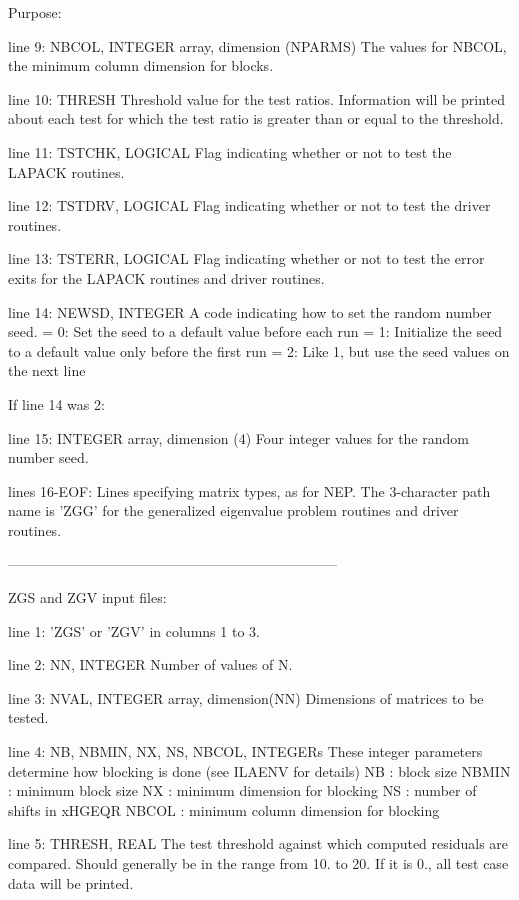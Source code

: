 \begin{DoxyParagraph}{Purpose\+: }
\begin{DoxyVerb}
 line 9:  NBCOL, INTEGER array, dimension (NPARMS)
          The values for NBCOL, the minimum column dimension for
          blocks.

 line 10: THRESH
          Threshold value for the test ratios.  Information will be
          printed about each test for which the test ratio is greater
          than or equal to the threshold.

 line 11: TSTCHK, LOGICAL
          Flag indicating whether or not to test the LAPACK routines.

 line 12: TSTDRV, LOGICAL
          Flag indicating whether or not to test the driver routines.

 line 13: TSTERR, LOGICAL
          Flag indicating whether or not to test the error exits for
          the LAPACK routines and driver routines.

 line 14: NEWSD, INTEGER
          A code indicating how to set the random number seed.
          = 0:  Set the seed to a default value before each run
          = 1:  Initialize the seed to a default value only before the
                first run
          = 2:  Like 1, but use the seed values on the next line

 If line 14 was 2:

 line 15: INTEGER array, dimension (4)
          Four integer values for the random number seed.

 lines 16-EOF:  Lines specifying matrix types, as for NEP.
          The 3-character path name is 'ZGG' for the generalized
          eigenvalue problem routines and driver routines.

-----------------------------------------------------------------------

 ZGS and ZGV input files:

 line 1:  'ZGS' or 'ZGV' in columns 1 to 3.

 line 2:  NN, INTEGER
          Number of values of N.

 line 3:  NVAL, INTEGER array, dimension(NN)
          Dimensions of matrices to be tested.

 line 4:  NB, NBMIN, NX, NS, NBCOL, INTEGERs
          These integer parameters determine how blocking is done
          (see ILAENV for details)
          NB     : block size
          NBMIN  : minimum block size
          NX     : minimum dimension for blocking
          NS     : number of shifts in xHGEQR
          NBCOL  : minimum column dimension for blocking

 line 5:  THRESH, REAL
          The test threshold against which computed residuals are
          compared. Should generally be in the range from 10. to 20.
          If it is 0., all test case data will be printed.


\end{DoxyVerb}
\end{DoxyParagraph}
